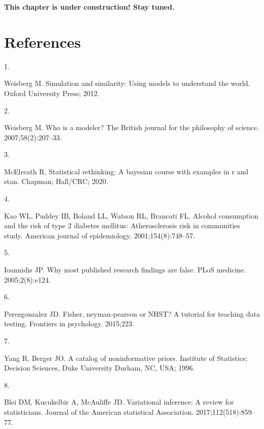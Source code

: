 \documentclass[
  10pt,
]{scrbook}
\newlength{\cslhangindent}
\newlength{\csllabelwidth}
\newlength{\cslentryspacingunit} %
\newenvironment{CSLReferences}[2] %
 {%
  \setlength{\parindent}{0pt}
  \ifodd #1
  \let\oldpar\par
  \def\par{\hangindent=\cslhangindent\oldpar}
  \fi
  \setlength{\parskip}{#2\cslentryspacingunit}
 }%
 {}
\newcommand{\CSLLeftMargin}[1]{\parbox[t]{\csllabelwidth}{#1}}
\newcommand{\CSLRightInline}[1]{\parbox[t]{\linewidth - \csllabelwidth}{#1}\break}
\begin{document}
\textbf{This chapter is under construction! Stay tuned.}

\hypertarget{references-1}{%
\chapter*{References}\label{references-1}}


\hypertarget{refs}{}
\begin{CSLReferences}{0}{0}
\leavevmode{}%
\CSLLeftMargin{1. }
\CSLRightInline{Weisberg M. Simulation and similarity: Using models to understand the world. Oxford University Press; 2012. }

\leavevmode{}%
\CSLLeftMargin{2. }
\CSLRightInline{Weisberg M. Who is a modeler? The British journal for the philosophy of science. 2007;58(2):207--33. }

\leavevmode{}%
\CSLLeftMargin{3. }
\CSLRightInline{McElreath R. Statistical rethinking: A bayesian course with examples in r and stan. Chapman; Hall/CRC; 2020. }

\leavevmode{}%
\CSLLeftMargin{4. }
\CSLRightInline{Kao WL, Puddey IB, Boland LL, Watson RL, Brancati FL. Alcohol consumption and the risk of type 2 diabetes mellitus: Atherosclerosis risk in communities study. American journal of epidemiology. 2001;154(8):748--57. }

\leavevmode{}%
\CSLLeftMargin{5. }
\CSLRightInline{Ioannidis JP. Why most published research findings are false. PLoS medicine. 2005;2(8):e124. }

\leavevmode{}%
\CSLLeftMargin{6. }
\CSLRightInline{Perezgonzalez JD. Fisher, neyman-pearson or NHST? A tutorial for teaching data testing. Frontiers in psychology. 2015;223. }

\leavevmode{}%
\CSLLeftMargin{7. }
\CSLRightInline{Yang R, Berger JO. A catalog of noninformative priors. Institute of Statistics; Decision Sciences, Duke University Durham, NC, USA; 1996. }

\leavevmode{}%
\CSLLeftMargin{8. }
\CSLRightInline{Blei DM, Kucukelbir A, McAuliffe JD. Variational inference: A review for statisticians. Journal of the American statistical Association. 2017;112(518):859--77. }


\end{CSLReferences}
\end{document}
